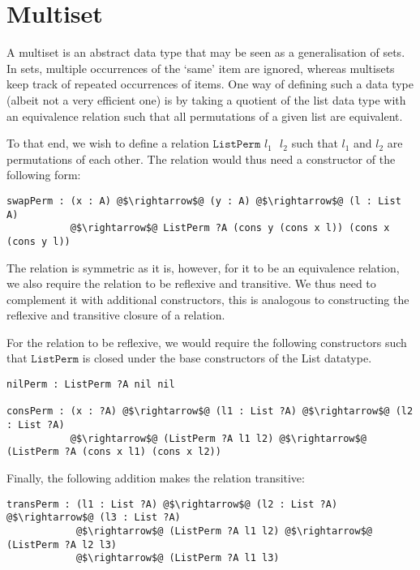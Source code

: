\documentclass[12pt,twoside,maitrise]{dms}
\theoremstyle{definition}
\numberwithin{equation}{section}
\numberwithin{table}{chapter}
\numberwithin{figure}{chapter}
\newcommand\fn[1] {\texttt{#1}}
\begin{document}
\section{Multiset}\label{sec:multiset}

A multiset is an abstract data type that may be seen as a generalisation of
sets. In sets, multiple occurrences of the `same' item are ignored, whereas
multisets keep track of repeated occurrences of items. One way of defining such
a data type (albeit not a very efficient one) is by taking a quotient of the
list data type with an equivalence relation such that all permutations of a
given list are equivalent.

To that end, we wish to define a relation $\fn{ListPerm $l_1$ $l_2$}$ such that
$\fn{$l_1$}$ and $\fn{$l_2$}$ are permutations of each other. The relation would
thus need a constructor of the following form:

\begin{verbatim}
swapPerm : (x : A) @$\rightarrow$@ (y : A) @$\rightarrow$@ (l : List A)
           @$\rightarrow$@ ListPerm ?A (cons y (cons x l)) (cons x (cons y l))
\end{verbatim}

The relation is symmetric as it is, however, for it to be an equivalence
relation, we also require the relation to be reflexive and transitive. We thus
need to complement it with additional constructors, this is analogous to
constructing the reflexive and transitive closure of a relation.

For the relation to be reflexive, we would require the following constructors
such that $\fn{ListPerm}$ is closed under the base constructors of the List
datatype.

\begin{verbatim}
nilPerm : ListPerm ?A nil nil

consPerm : (x : ?A) @$\rightarrow$@ (l1 : List ?A) @$\rightarrow$@ (l2 : List ?A)
           @$\rightarrow$@ (ListPerm ?A l1 l2) @$\rightarrow$@ (ListPerm ?A (cons x l1) (cons x l2))
\end{verbatim}

Finally, the following addition makes the relation transitive:

\begin{verbatim}
transPerm : (l1 : List ?A) @$\rightarrow$@ (l2 : List ?A) @$\rightarrow$@ (l3 : List ?A)
            @$\rightarrow$@ (ListPerm ?A l1 l2) @$\rightarrow$@ (ListPerm ?A l2 l3)
            @$\rightarrow$@ (ListPerm ?A l1 l3)
\end{verbatim}
\end{document}
